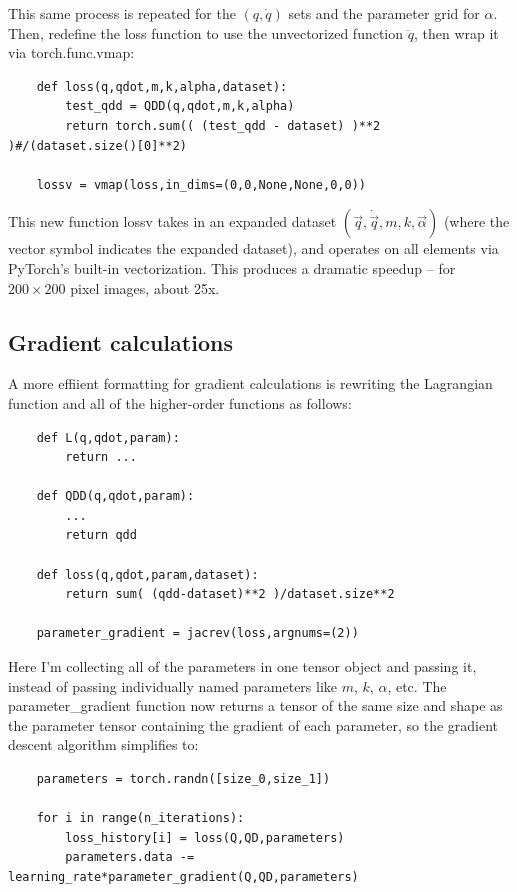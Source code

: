 \documentclass[]{article}
\begin{document}
This same process is repeated for the $(q,\dot{q})$ sets and the parameter grid for $\alpha$. Then, redefine the loss function to use the unvectorized function $\ddot{q}$, then wrap it via torch.func.vmap:

\begin{lstlisting}
	def loss(q,qdot,m,k,alpha,dataset):
		test_qdd = QDD(q,qdot,m,k,alpha)
		return torch.sum(( (test_qdd - dataset) )**2 )#/(dataset.size()[0]**2)
	
	lossv = vmap(loss,in_dims=(0,0,None,None,0,0))
\end{lstlisting}

This new function lossv takes in an expanded dataset $(\vec{q},\dot{\vec{q}},m,k,\vec{\alpha})$ (where the vector symbol indicates the expanded dataset), and operates on all elements via PyTorch's built-in vectorization. This produces a dramatic speedup -- for $200\times 200$ pixel images, about 25x.

\subsection{Gradient calculations}
A more effiient formatting for gradient calculations is rewriting the Lagrangian function and all of the higher-order functions as follows:

\begin{lstlisting}
	def L(q,qdot,param):
		return ...
		
	def QDD(q,qdot,param):
		...
		return qdd
	
	def loss(q,qdot,param,dataset):
		return sum( (qdd-dataset)**2 )/dataset.size**2
	
	parameter_gradient = jacrev(loss,argnums=(2))
\end{lstlisting}

Here I'm collecting all of the parameters in one tensor object and passing it, instead of passing individually named parameters like $m$, $k$, $\alpha$, etc. The parameter\_gradient function now returns a tensor of the same size and shape as the parameter tensor containing the gradient of each parameter, so the gradient descent algorithm simplifies to:

\begin{lstlisting}
	parameters = torch.randn([size_0,size_1])
	
	for i in range(n_iterations):
		loss_history[i] = loss(Q,QD,parameters)
		parameters.data -= learning_rate*parameter_gradient(Q,QD,parameters)
\end{lstlisting}
\end{document}

